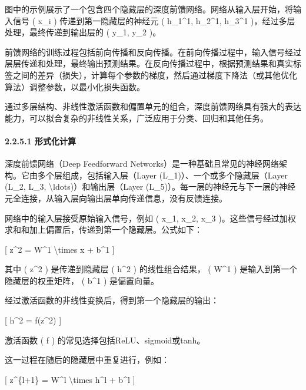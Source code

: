 图中的示例展示了一个包含四个隐藏层的深度前馈网络。网络从输入层开始，将输入信号
( x\_i ) 传递到第一隐藏层的神经元 ( h\_1\^{}1, h\_2\^{}1, h\_3\^{}1
)，经过多层处理，最终传递到输出层的 ( y\_1, y\_2 )。

前馈网络的训练过程包括前向传播和反向传播。在前向传播过程中，输入信号经过层层传递和处理，最终输出预测结果。在反向传播过程中，根据预测结果和真实标签之间的差异（损失），计算每个参数的梯度，然后通过梯度下降法（或其他优化算法）调整参数，以最小化损失函数。

通过多层结构、非线性激活函数和偏置单元的组合，深度前馈网络具有强大的表达能力，可以拟合复杂的非线性关系，广泛应用于分类、回归和其他任务。

\paragraph{\texorpdfstring{\textbf{2.2.5.1
形式化计算}}{2.2.5.1 形式化计算}}\label{2251-ux5f62ux5f0fux5316ux8ba1ux7b97}

深度前馈网络（Deep Feedforward
Networks）是一种基础且常见的神经网络架构。它由多个层组成，包括输入层（Layer
(L\_1)）、一个或多个隐藏层（Layer (L\_2, L\_3,
\textbackslash ldots)）和输出层（Layer
(L\_5)）。每一层的神经元与下一层的神经元全连接，从输入层向输出层单向传递信息，没有反馈连接。

网络中的输入层接受原始输入信号，例如 ( x\_1, x\_2, x\_3
)。这些信号经过加权求和和加上偏置后，传递到第一个隐藏层。公式如下：

{[} z\^{}2 = W\^{}1 \textbackslash times x + b\^{}1 {]}


其中 ( z\^{}2 ) 是传递到隐藏层 ( h\^{}2 ) 的线性组合结果， ( W\^{}1 )
是输入到第一个隐藏层的权重矩阵， ( b\^{}1 ) 是偏置向量。

经过激活函数的非线性变换后，得到第一个隐藏层的输出：

{[} h\^{}2 = f(z\^{}2) {]}


激活函数 ( f ) 的常见选择包括ReLU、sigmoid或tanh。

这一过程在随后的隐藏层中重复进行，例如：

{[} z\^{}\{l+1\} = W\^{}l \textbackslash times h\^{}l + b\^{}l {]}

